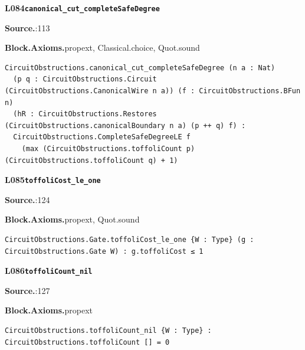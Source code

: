 \par\medskip\noindent\begin{minipage}{\textwidth}
{\small\bfseries L084\enspace\texttt{canonical\_cut\_completeSafeDegree}\par}
{\footnotesize\raggedright\textbf{Source.}\enspace{}:113\par
\textbf{Block.}\quad\textbf{Axioms.}\enspace propext, Classical.choice, Quot.sound\par}\nopagebreak
\begin{lstlisting}
CircuitObstructions.canonical_cut_completeSafeDegree (n a : Nat)
  (p q : CircuitObstructions.Circuit (CircuitObstructions.CanonicalWire n a)) (f : CircuitObstructions.BFun n)
  (hR : CircuitObstructions.Restores (CircuitObstructions.canonicalBoundary n a) (p ++ q) f) :
  CircuitObstructions.CompleteSafeDegreeLE f
    (max (CircuitObstructions.toffoliCount p) (CircuitObstructions.toffoliCount q) + 1)
\end{lstlisting}
\end{minipage}\par

\par\medskip\noindent\begin{minipage}{\textwidth}
{\small\bfseries L085\enspace\texttt{toffoliCost\_le\_one}\par}
{\footnotesize\raggedright\textbf{Source.}\enspace{}:124\par
\textbf{Block.}\quad\textbf{Axioms.}\enspace propext, Quot.sound\par}\nopagebreak
\begin{lstlisting}
CircuitObstructions.Gate.toffoliCost_le_one {W : Type} (g : CircuitObstructions.Gate W) : g.toffoliCost ≤ 1
\end{lstlisting}
\end{minipage}\par

\par\medskip\noindent\begin{minipage}{\textwidth}
{\small\bfseries L086\enspace\texttt{toffoliCount\_nil}\par}
{\footnotesize\raggedright\textbf{Source.}\enspace{}:127\par
\textbf{Block.}\quad\textbf{Axioms.}\enspace propext\par}\nopagebreak
\begin{lstlisting}
CircuitObstructions.toffoliCount_nil {W : Type} : CircuitObstructions.toffoliCount [] = 0
\end{lstlisting}
\end{minipage}\par

